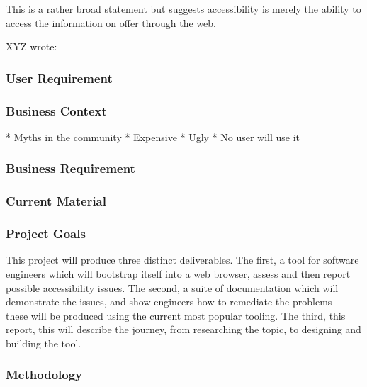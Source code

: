 This is a rather broad statement but suggests accessibility is merely the
ability to access the information on offer through the web.

XYZ wrote:
\begin{quote}

\end{quote}


\subsubsection{User Requirement}
\subsubsection{Business Context}
* Myths in the community
  * Expensive
  * Ugly
  * No user will use it
\subsubsection{Business Requirement}
\subsubsection{Current Material}

\subsubsection{Project Goals}
This project will produce three distinct deliverables. The first, a tool for software engineers which will bootstrap itself into a web
browser, assess and then report possible accessibility issues. The second, a suite of documentation which will demonstrate the issues, and
show engineers how to remediate the problems - these will be produced using the current most popular tooling. The third, this report,
this will describe the journey, from researching the topic, to designing and building the tool.

\subsubsection{Methodology}
